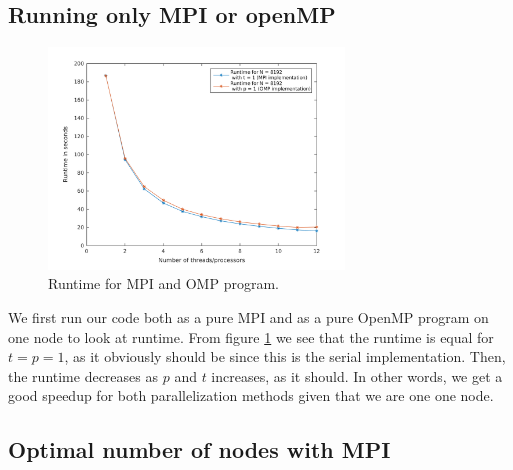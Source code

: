 \subsection*{Running only MPI or openMP}
\begin{figure}[h!]
			\centering
			\includegraphics[width=0.7\textwidth]{./figures/runtime_either_MPI_OMP}
			\caption{Runtime for MPI and OMP program.}
			\label{fig:MPIvsOMP}
\end{figure}
We first run our code both as a pure MPI and as a pure OpenMP program on one node to look at runtime. From figure \ref{fig:MPIvsOMP} we see that the runtime is equal for $t = p = 1$, as it obviously should be since this is the serial implementation. Then, the runtime decreases as $p$ and $t$ increases, as it should. In other words, we get a good speedup for both parallelization methods given that we are one one node. 


\subsection*{Optimal number of nodes with MPI}

